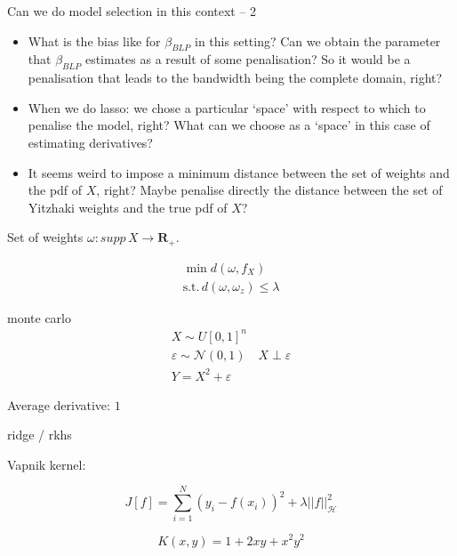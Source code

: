 \documentclass[10pt,xcolor=table]{beamer}
\newcommand{\s}{\sum_{i = 1}^N}
\begin{document}
\begin{frame}{Can we do model selection in this context -- 2}
	\begin{itemize}
		\item What is the bias like for $\beta_{BLP}$ in this setting? Can we obtain the parameter that $\beta_{BLP}$ estimates as a result of some penalisation? So it would be a penalisation that leads to the bandwidth being the complete domain, right?
		\item When we do lasso: we chose a particular `space' with respect to which to penalise the model, right? What can we choose as a `space' in this case of estimating derivatives?
		\item It seems weird to impose a minimum distance between the set of weights and the pdf of $X$, right? Maybe penalise directly the distance between the set of Yitzhaki weights and the true pdf of $X$?
	\end{itemize}
	
	Set of weights $\omega: supp \, X \rightarrow \mathbf{R}_+$.

\begin{align}
	\min d(\omega, f_X) \\
	\textrm{s.t.} \, d(\omega, \omega_z) \leq \lambda
\end{align}
\end{frame}


\begin{frame}{monte carlo}
\begin{equation}
\begin{split}
X \sim U [0, 1] ^ n \\
\varepsilon \sim \mathcal{N} (0, 1) \quad X \perp \varepsilon \\
Y = X ^ 2 + \varepsilon
\end{split}
\end{equation}

Average derivative: $1$


\end{frame}


\begin{frame}{ridge / rkhs}

Vapnik kernel:

\begin{equation}
  J[f] = \s \left( y_i - f(x_i) \right)^2 + \lambda || f ||^2_{\mathcal{H}}
\end{equation}


\begin{equation}
K(x, y) = 1 + 2 x y + x^2 y^2
\end{equation}

\end{frame}
\end{document}
